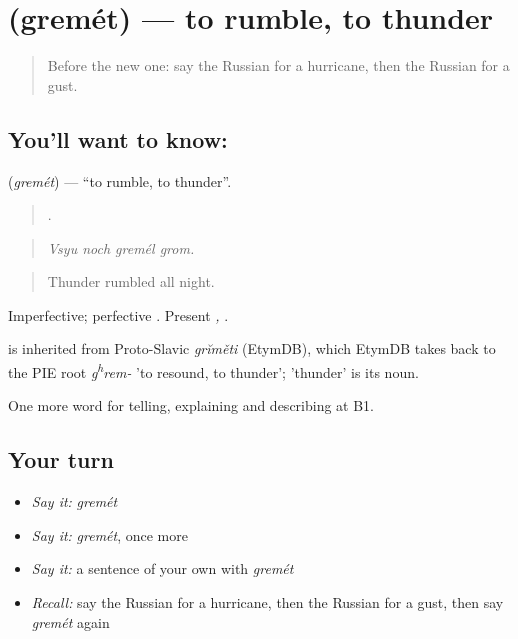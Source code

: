 \section[\texorpdfstring{\ru{греметь} (gremét)}{греметь (gremét)}]{ (gremét) — to rumble, to thunder}

\label{lesson:RU-C466-gremet}



\begin{quote}
Before the new one: say the Russian for a hurricane, then the Russian for a gust.
\end{quote}

\subsection*{You'll want to know: }
\textbf{} (\emph{gremét}) — \textquotedblleft{}to rumble, to thunder\textquotedblright{}.

\begin{quote}
   .
\end{quote}

\begin{quote}
\emph{Vsyu noch gremél grom.}
\end{quote}

\begin{quote}
Thunder rumbled all night.
\end{quote}

Imperfective; perfective \emph{}. Present \emph{, }.

\begin{cousinweb}
\emph{} is inherited from Proto-Slavic \emph{grĭměti} (EtymDB), which EtymDB takes back to the PIE root \emph{g\textsuperscript{h}rem-} 'to resound, to thunder'; \emph{} 'thunder' is its noun.
\end{cousinweb}

\begin{grammarlens}[title={What you've built}]
One more word for telling, explaining and describing at B1.
\end{grammarlens}

\subsection*{Your turn}
\begin{itemize}
\raggedright
  \item \emph{Say it:} \emph{gremét}
  \item \emph{Say it:} \emph{gremét}, once more
  \item \emph{Say it:} a sentence of your own with \emph{gremét}
  \item \emph{Recall:} say the Russian for a hurricane, then the Russian for a gust, then say \emph{gremét} again
\end{itemize}

